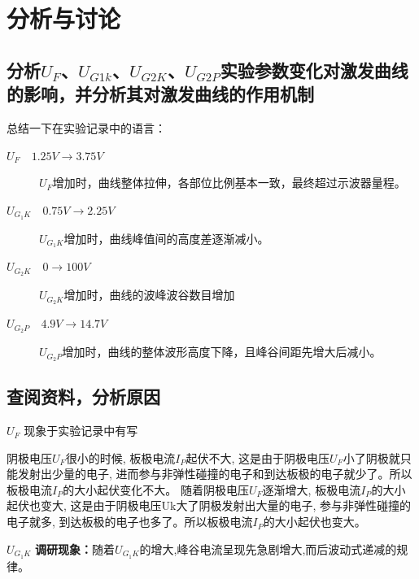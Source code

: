 \documentclass[a4paper,UTF8]{ctexart}
\begin{document}
\newpage

\section{分析与讨论}

\subsection{分析$U_F$、$U_{G1k}$、$U_{G2K}$、$U_{G2P}$实验参数变化对激发曲线的影响，并分析其对激发曲线的作用机制}

总结一下在实验记录中的语言：

\begin{description}
    \item[\bfseries $U_{F} \quad 1.25V \longrightarrow 3.75V$] $U_F$增加时，曲线整体拉伸，各部位比例基本一致，最终超过示波器量程。
    \item[\bfseries $U_{G_{1}K} \quad 0.75V \longrightarrow 2.25V$] $U_{G_{1}K}$增加时，曲线峰值间的高度差逐渐减小。
    \item[\bfseries $U_{G_{2}K} \quad 0 \longrightarrow 100 V$] $U_{G_{2}K}$增加时，曲线的波峰波谷数目增加
    \item[\bfseries $U_{G_{2}P} \quad 4.9V \longrightarrow 14.7V$] $U_{G_{2}P}$增加时，曲线的整体波形高度下降，且峰谷间距先增大后减小。
\end{description}

\subsection{查阅资料，分析原因}

{\uppercase\expandafter{}  \bfseries $U_{F}$} 现象于实验记录中有写\cite{UF}
\begin{framed}
阴极电压$U_F$很小的时候, 板极电流$I_P$起伏不大, 这是由于阴极电压$U_F$小了阴极就只能发射出少量的电子,
 进而参与非弹性碰撞的电子和到达板极的电子就少了。所以板极电流$I_P$的大小起伏变化不大。
 随着阴极电压$U_F$逐渐增大, 板极电流$I_P$的大小起伏也变大, 这是由于阴极电压Uk大了阴极发射出大量的电子, 
 参与非弹性碰撞的电子就多, 到达板极的电子也多了。所以板极电流$I_P$的大小起伏也变大。
\end{framed}

{\uppercase\expandafter{} \bfseries $U_{G_{1}K}$} {\textbf{调研现象：}}随着$U_{G_{1}K}$的增大,峰谷电流呈现先急剧增大,而后波动式递减的规律。\cite{UG1K}
\end{document}
